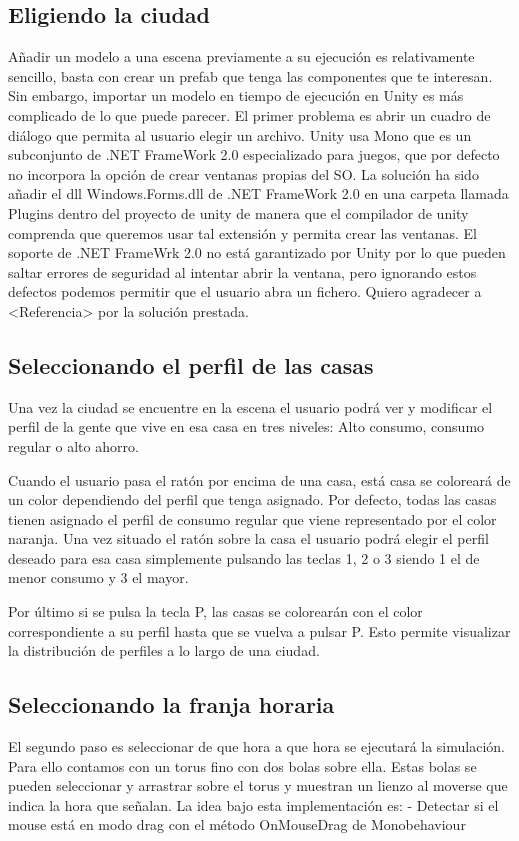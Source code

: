 \documentclass[12pt,a4paper,openright,oneside]{article}
\numberwithin{equation}{section}
\theoremstyle{definition}
\begin{document}
\subsection{Eligiendo la ciudad}

Añadir un modelo a una escena previamente a su ejecución es relativamente sencillo, basta con crear un prefab que tenga las componentes que te interesan. Sin embargo, importar un modelo en tiempo de ejecución en Unity es más complicado de lo que puede parecer. El primer problema es abrir un cuadro de diálogo que permita al usuario elegir un archivo. Unity usa Mono que es un subconjunto de .NET FrameWork 2.0 especializado para juegos, que por defecto no incorpora la opción de crear ventanas propias del SO. 
La solución ha sido añadir el dll Windows.Forms.dll de .NET FrameWork 2.0 en una carpeta llamada Plugins dentro del proyecto de unity de manera que el compilador de unity comprenda que queremos usar tal extensión y permita crear las ventanas. El soporte de .NET FrameWrk 2.0 no está garantizado por Unity por lo que pueden saltar errores de seguridad al intentar abrir la ventana, pero ignorando estos defectos podemos permitir que el usuario abra un fichero. Quiero agradecer a <Referencia> por la solución prestada.

\subsection{Seleccionando el perfil de las casas}
Una vez la ciudad se encuentre en la escena el usuario podrá ver y modificar el perfil de la gente que vive en esa casa en tres niveles: Alto consumo, consumo regular o alto ahorro. 

Cuando el usuario pasa el ratón por encima de una casa, está casa se coloreará de un color dependiendo del perfil que tenga asignado. Por defecto, todas las casas tienen asignado el perfil de consumo regular que viene representado por el color naranja. Una vez situado el ratón sobre la casa el usuario podrá elegir el perfil deseado para esa casa simplemente pulsando las teclas 1, 2 o 3 siendo 1 el de menor consumo y 3 el mayor. 

Por último si se pulsa la tecla P, las casas se colorearán con el color correspondiente a su perfil hasta que se vuelva a pulsar P. Esto permite visualizar la distribución de perfiles a lo largo de una ciudad.

\subsection{Seleccionando la franja horaria}
El segundo paso es seleccionar de que hora a que hora se ejecutará la simulación. Para ello contamos con un torus fino con dos bolas sobre ella. Estas bolas se pueden seleccionar y arrastrar sobre el torus y muestran un lienzo al moverse que indica la hora que señalan. La idea bajo esta implementación es:
- Detectar si el mouse está en modo drag con el método OnMouseDrag de Monobehaviour
\end{document}
